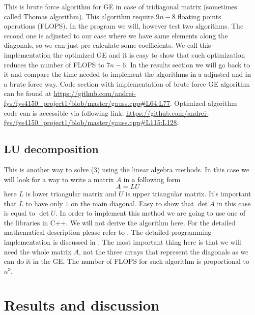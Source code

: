 \documentclass[10pt]{article}
\begin{document}
This is brute force algorithm for GE in case of tridiagonal matrix (sometimes called Thomas algorithm). This algorithm require $ 9n-8 $ floating points operations (FLOPS). In the program we will, however test two algorithms. The second one is adjusted to our case where we have same elements along the diagonals, so we can just pre-calculate some coefficients. We call this implementation the optimized GE and it is easy to show that such optimization reduces the number of FLOPS to $ 7n-6 $. In the results section we will go back to it and compare the time needed to implement the algorithms in a adjusted and in a brute force way. Code section with implementation of brute force GE algorithm can be found at \url{https://github.com/andrei-fys/fys4150_project1/blob/master/gauss.cpp#L64:L77}. Optimized algorithm code can is accessible via following link: \url{https://github.com/andrei-fys/fys4150_project1/blob/master/gauss.cpp#L115:L128}.

\subsection{LU decomposition}
This is another way to solve (3) using the linear algebra methods. In this case we will look for a way to write a matrix $ A $ in a following form
\begin{equation}
A=LU
\end{equation}
here $ L $ is lower triangular matrix and $ U $ is upper triangular matrix. It's important that $ L $ to have only $ 1 $ on the main diagonal. Easy to show that $ \det A $ in this case is equal to $ \det U $. In order to implement this method we are going to use one of the libraries in C++. We will not derive the algorithm here. For the detailed mathematical description please refer to \cite{one}. The detailed programming implementation is discussed in \cite{two}.
The most important thing here is that we will need the whole matrix $ A $, not the three arrays that represent the diagonals as we can do it in the GE. The number of FLOPS for such algorithm is proportional to $ n^{3} $.

\newpage
\section{Results and discussion}
\end{document}
